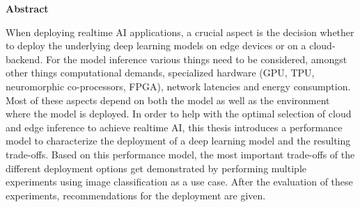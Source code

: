 \vspace*{2cm}

\begin{center}
    \textbf{Abstract}
\end{center}

\vspace*{1cm}


\noindent When deploying realtime AI applications, a crucial aspect is the decision whether to deploy the underlying deep learning models on edge devices or on a cloud-backend.
For the model inference various things need to be considered, amongst other things computational demands,
specialized hardware (GPU, TPU, neuromorphic co-processors, FPGA),
network latencies and energy consumption. Most of these aspects depend on both the model as well as the environment where the model is deployed. 
In order to help with the optimal selection of cloud and edge inference to achieve realtime AI, this thesis introduces a performance model to characterize the deployment of a deep learning model and the resulting trade-offs.
Based on this performance model, the most important trade-offs of the different deployment options get demonstrated by performing multiple experiments using image classification as a use case. After the evaluation of these experiments, recommendations for the deployment are given.






